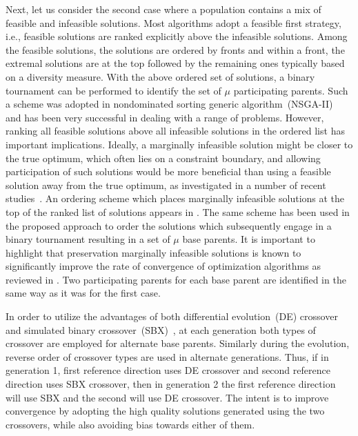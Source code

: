 Next, let us consider the second case where a population contains a mix of feasible and infeasible solutions. Most algorithms adopt a feasible first strategy, i.e., feasible solutions are ranked explicitly above the infeasible solutions. Among the feasible solutions, the solutions are ordered by fronts and within a front, the extremal solutions are at the top followed by the remaining ones typically based on a diversity measure. With the above ordered set of solutions, a binary tournament can be performed to identify the set of $\mu$ participating parents. Such a scheme was adopted in nondominated sorting generic algorithm~(NSGA-II)~\cite{deb2002fast} and has been very successful in dealing with a range of problems. However, ranking all feasible solutions above all infeasible solutions in the ordered list has important implications\cite{Ray2009idea,Singh2013idea}. Ideally, a marginally infeasible solution might be closer to the true optimum, which often lies on a constraint boundary, and allowing participation of such solutions would be more beneficial than using a feasible solution away from the true optimum, as investigated in a number of recent studies~\cite{singh2016use}. An ordering scheme which places marginally infeasible solutions at the top of the ranked list of solutions appears in \cite{Ray2009idea}. The same scheme has been used in the proposed approach to order the solutions which subsequently engage in a binary tournament resulting in a set of $\mu$ base parents. It is important to highlight that preservation marginally infeasible solutions is known to significantly improve the rate of convergence of optimization algorithms as reviewed in \cite{singh2016use}. Two participating parents for each base parent are identified in the same way as it was for the first case. 

In order to utilize the advantages of both differential evolution~(DE) crossover~\cite{das2011de} and simulated binary crossover~(SBX)~\cite{deb2002fast}, at each generation both types of crossover are employed for alternate base parents. Similarly during the evolution, reverse order of crossover types are used in alternate generations. Thus, if in generation 1, first reference direction uses DE crossover and second reference direction uses SBX crossover, then in generation 2 the first reference direction will use SBX and the second will use DE crossover. The intent is to improve convergence by adopting the high quality solutions generated using the two crossovers, while also avoiding bias towards either of them. 

